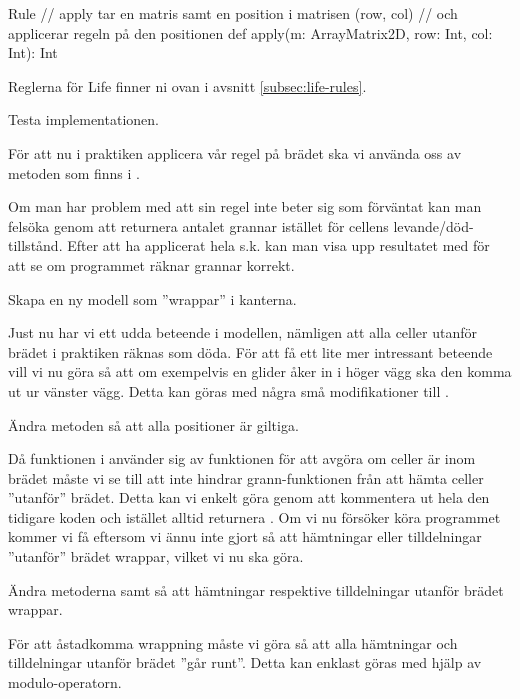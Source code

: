 \begin{ScalaSpec}{Rule}
// apply tar en matris samt en position i matrisen (row, col)
// och applicerar regeln på den positionen
def apply(m: ArrayMatrix2D, row: Int, col: Int): Int
\end{ScalaSpec}

Reglerna för Life finner ni ovan i avsnitt \ref{subsec:life-rules}.

\Subtask Testa implementationen.

För att nu i praktiken applicera vår regel på brädet ska vi använda oss av metoden  som finns i .

Om man har problem med att sin regel inte beter sig som förväntat kan man felsöka genom att returnera antalet grannar istället för cellens levande/död-tillstånd. Efter att ha applicerat hela s.k.  kan man visa upp resultatet med  för att se om programmet räknar grannar korrekt.


\Task Skapa en ny modell som ''wrappar'' i kanterna.

Just nu har vi ett udda beteende i modellen, nämligen att alla celler utanför brädet i praktiken räknas som döda. För att få ett lite mer intressant beteende vill vi nu göra så att om exempelvis en glider åker in i höger vägg ska den komma ut ur vänster vägg. Detta kan göras med några små modifikationer till .

\Subtask Ändra metoden  så att alla positioner är giltiga.

Då funktionen  i  använder sig av funktionen  för att avgöra om celler är inom brädet måste vi se till att  inte hindrar grann-funktionen från att hämta celler ''utanför'' brädet. Detta kan vi enkelt göra genom att kommentera ut hela den tidigare koden och istället alltid returnera . Om vi nu försöker köra programmet kommer vi få  eftersom vi ännu inte gjort så att hämtningar eller tilldelningar ''utanför'' brädet wrappar, vilket vi nu ska göra.

\Subtask Ändra metoderna  samt  så att hämtningar respektive tilldelningar utanför brädet wrappar.

För att åstadkomma wrappning måste vi göra så att alla hämtningar och tilldelningar utanför brädet ''går runt''. Detta kan enklast göras med hjälp av modulo-operatorn.

